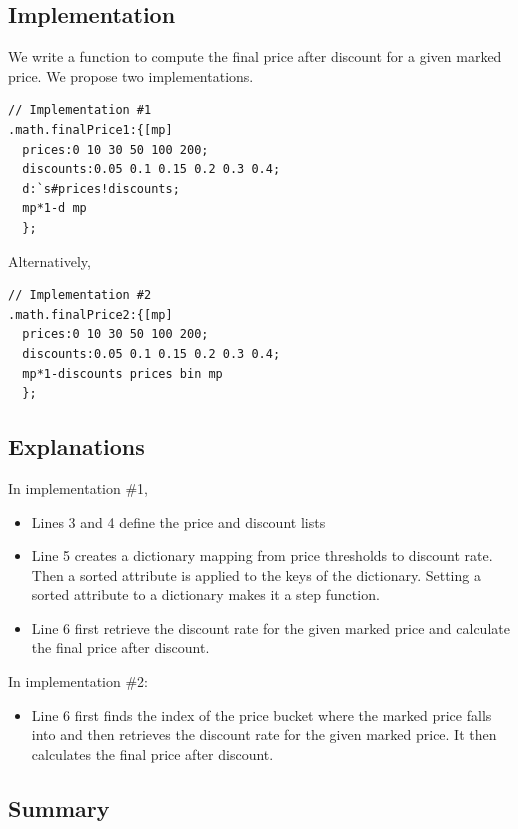 \subsection{Implementation}
We write a function to compute the final price after discount for a given marked price. We propose two implementations.

\begin{verbatim}
// Implementation #1
.math.finalPrice1:{[mp]
  prices:0 10 30 50 100 200;
  discounts:0.05 0.1 0.15 0.2 0.3 0.4;
  d:`s#prices!discounts;
  mp*1-d mp
  };
\end{verbatim}

Alternatively,
\begin{verbatim}
// Implementation #2
.math.finalPrice2:{[mp]
  prices:0 10 30 50 100 200;
  discounts:0.05 0.1 0.15 0.2 0.3 0.4;
  mp*1-discounts prices bin mp
  };
\end{verbatim}

\subsection{Explanations}
In implementation \#1,

\begin{itemize}
\item Lines 3 and 4 define the price and discount lists
\item Line 5 creates a dictionary mapping from price thresholds to discount rate. Then a sorted attribute is applied to the keys of the dictionary. Setting a sorted attribute to a dictionary makes it a step function.
\item Line 6 first retrieve the discount rate for the given marked price and calculate the final price after discount.
\end{itemize}

In implementation \#2:

\begin{itemize}
\item Line 6 first finds the index of the price bucket where the marked price falls into and then retrieves the discount rate for the given marked price. It then calculates the final price after discount.
\end{itemize}

\subsection{Summary}

